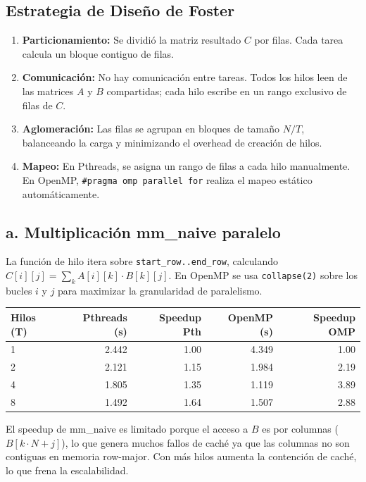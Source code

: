 \documentclass[11pt,a4paper]{article}
\begin{document}
\subsection*{Estrategia de Diseño de Foster}
\begin{enumerate}
    \item \textbf{Particionamiento:} Se dividió la matriz resultado $C$ por filas. Cada tarea calcula un bloque contiguo de filas.
    \item \textbf{Comunicación:} No hay comunicación entre tareas. Todos los hilos leen de las matrices $A$ y $B$ compartidas; cada hilo escribe en un rango exclusivo de filas de $C$.
    \item \textbf{Aglomeración:} Las filas se agrupan en bloques de tamaño $N/T$, balanceando la carga y minimizando el overhead de creación de hilos.
    \item \textbf{Mapeo:} En Pthreads, se asigna un rango de filas a cada hilo manualmente. En OpenMP, \texttt{\#pragma omp parallel for} realiza el mapeo estático automáticamente.
\end{enumerate}

\subsection*{a. Multiplicación mm\_naive paralelo}

La función de hilo itera sobre \texttt{start\_row..end\_row}, calculando $C[i][j] = \sum_k A[i][k] \cdot B[k][j]$. En OpenMP se usa \texttt{collapse(2)} sobre los bucles $i$ y $j$ para maximizar la granularidad de paralelismo.

\begin{center}
\begin{tabular}{|l|r|r|r|r|}
\hline
\textbf{Hilos (T)} & \textbf{Pthreads (s)} & \textbf{Speedup Pth} & \textbf{OpenMP (s)} & \textbf{Speedup OMP} \\
\hline
1 & 2.442 & 1.00 & 4.349 & 1.00 \\
2 & 2.121 & 1.15 & 1.984 & 2.19 \\
4 & 1.805 & 1.35 & 1.119 & 3.89 \\
8 & 1.492 & 1.64 & 1.507 & 2.88 \\
\hline
\end{tabular}
\end{center}

El speedup de mm\_naive es limitado porque el acceso a $B$ es por columnas ($B[k \cdot N + j]$), lo que genera muchos fallos de caché ya que las columnas no son contiguas en memoria row-major. Con más hilos aumenta la contención de caché, lo que frena la escalabilidad.
\end{document}
